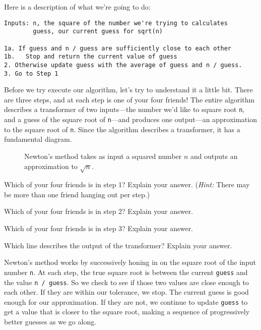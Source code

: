 Here is a description of what we're going to do:

\begin{lstlisting}[caption={Newton's method for calculating square roots}]
Inputs: n, the square of the number we're trying to calculates
        guess, our current guess for sqrt(n)

1a. If guess and n / guess are sufficiently close to each other
1b.   Stop and return the current value of guess
2. Otherwise update guess with the average of guess and n / guess.
3. Go to Step 1
\end{lstlisting}

Before we try execute our algorithm, let's try to understand it a little bit. There are three steps, and at each step is one of your four friends! The entire algorithm describes a transformer of two inputs---the number we'd like to square root \texttt{n}, and a guess of the square root of \texttt{n}---and produces one output---an approximation to the square root of \texttt{n}. Since the algorithm describes a transformer, it has a fundamental diagram.

\begin{figure*}
  
  \caption{\label{fig:intro-newton-fundamental-diagram} Newton's method takes as input a squared number $n$ and outputs an approximation to $\sqrt{n}$.}
\end{figure*}

\begin{question}
  Which of your four friends is in step 1? Explain your answer. (\textit{Hint:} There may be more than one friend hanging out per step.)
\end{question}

\begin{question}
  Which of your four friends is in step 2? Explain your answer.
\end{question}

\begin{question}
  Which of your four friends is in step 3? Explain your answer.
\end{question}

\begin{question}
  Which line describes the output of the transformer? Explain your answer.
\end{question}

Newton's method works by successively honing in on the square root of the input number \texttt{n}. At each step, the true square root is between the current \texttt{guess} and the value \texttt{n / guess}. So we check to see if those two values are close enough to each other. If they are within our tolerance, we stop. The current guess is good enough for our approximation. If they are not, we continue to update \texttt{guess} to get a value that is closer to the square root, making a sequence of progressively better guesses as we go along.

